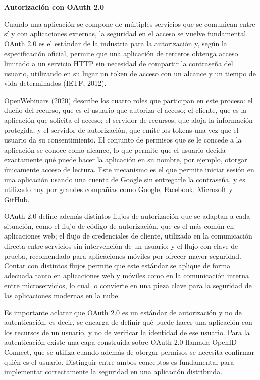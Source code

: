 \documentclass[12pt,letterpaper]{article}
\newcommand{\subtitulo}[1]{\vspace{12pt}\noindent\textbf{#1}\par\vspace{10pt}}
\begin{document}
\subtitulo{Autorización con OAuth 2.0}
Cuando una aplicación se compone de múltiples servicios que se comunican entre sí y con aplicaciones externas, la seguridad en el acceso se vuelve fundamental. OAuth 2.0 es el estándar de la industria para la autorización y, según la especificación oficial, permite que una aplicación de terceros obtenga acceso limitado a un servicio HTTP sin necesidad de compartir la contraseña del usuario, utilizando en su lugar un token de acceso con un alcance y un tiempo de vida determinados (IETF, 2012).

OpenWebinars (2020) describe los cuatro roles que participan en este proceso: el dueño del recurso, que es el usuario que autoriza el acceso; el cliente, que es la aplicación que solicita el acceso; el servidor de recursos, que aloja la información protegida; y el servidor de autorización, que emite los tokens una vez que el usuario da su consentimiento. El conjunto de permisos que se le concede a la aplicación se conoce como alcance, lo que permite que el usuario decida exactamente qué puede hacer la aplicación en su nombre, por ejemplo, otorgar únicamente acceso de lectura. Este mecanismo es el que permite iniciar sesión en una aplicación usando una cuenta de Google sin entregarle la contraseña, y es utilizado hoy por grandes compañías como Google, Facebook, Microsoft y GitHub.

OAuth 2.0 define además distintos flujos de autorización que se adaptan a cada situación, como el flujo de código de autorización, que es el más común en aplicaciones web; el flujo de credenciales de cliente, utilizado en la comunicación directa entre servicios sin intervención de un usuario; y el flujo con clave de prueba, recomendado para aplicaciones móviles por ofrecer mayor seguridad. Contar con distintos flujos permite que este estándar se aplique de forma adecuada tanto en aplicaciones web y móviles como en la comunicación interna entre microservicios, lo cual lo convierte en una pieza clave para la seguridad de las aplicaciones modernas en la nube.

Es importante aclarar que OAuth 2.0 es un estándar de autorización y no de autenticación, es decir, se encarga de definir qué puede hacer una aplicación con los recursos de un usuario, y no de verificar la identidad de ese usuario. Para la autenticación existe una capa construida sobre OAuth 2.0 llamada OpenID Connect, que se utiliza cuando además de otorgar permisos se necesita confirmar quién es el usuario. Distinguir entre ambos conceptos es fundamental para implementar correctamente la seguridad en una aplicación distribuida.
\end{document}
